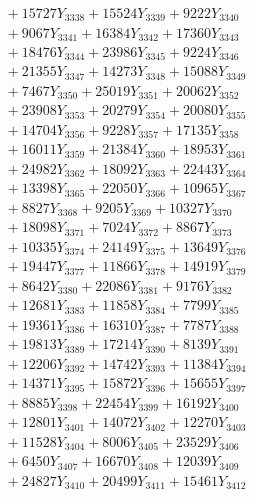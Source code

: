 \documentclass[a4paper,10pt]{article}
\begin{document}
{\begin{align}
&\;  + 15727 Y_{3338} + 15524 Y_{3339} + 9222 Y_{3340} \\[0.3ex]
&\;  + 9067 Y_{3341} + 16384 Y_{3342} + 17360 Y_{3343} \\[0.3ex]
&\;  + 18476 Y_{3344} + 23986 Y_{3345} + 9224 Y_{3346} \\[0.3ex]
&\;  + 21355 Y_{3347} + 14273 Y_{3348} + 15088 Y_{3349} \\[0.3ex]
&\;  + 7467 Y_{3350} + 25019 Y_{3351} + 20062 Y_{3352} \\[0.3ex]
&\;  + 23908 Y_{3353} + 20279 Y_{3354} + 20080 Y_{3355} \\[0.3ex]
&\;  + 14704 Y_{3356} + 9228 Y_{3357} + 17135 Y_{3358} \\[0.5ex]\allowbreak
&\;  + 16011 Y_{3359} + 21384 Y_{3360} + 18953 Y_{3361} \\[0.3ex]
&\;  + 24982 Y_{3362} + 18092 Y_{3363} + 22443 Y_{3364} \\[0.3ex]
&\;  + 13398 Y_{3365} + 22050 Y_{3366} + 10965 Y_{3367} \\[0.3ex]
&\;  + 8827 Y_{3368} + 9205 Y_{3369} + 10327 Y_{3370} \\[0.3ex]
&\;  + 18098 Y_{3371} + 7024 Y_{3372} + 8867 Y_{3373} \\[0.3ex]
&\;  + 10335 Y_{3374} + 24149 Y_{3375} + 13649 Y_{3376} \\[0.3ex]
&\;  + 19447 Y_{3377} + 11866 Y_{3378} + 14919 Y_{3379} \\[0.3ex]
&\;  + 8642 Y_{3380} + 22086 Y_{3381} + 9176 Y_{3382} \\[0.3ex]
&\;  + 12681 Y_{3383} + 11858 Y_{3384} + 7799 Y_{3385} \\[0.3ex]
&\;  + 19361 Y_{3386} + 16310 Y_{3387} + 7787 Y_{3388} \\[0.5ex]\allowbreak
&\;  + 19813 Y_{3389} + 17214 Y_{3390} + 8139 Y_{3391} \\[0.3ex]
&\;  + 12206 Y_{3392} + 14742 Y_{3393} + 11384 Y_{3394} \\[0.3ex]
&\;  + 14371 Y_{3395} + 15872 Y_{3396} + 15655 Y_{3397} \\[0.3ex]
&\;  + 8885 Y_{3398} + 22454 Y_{3399} + 16192 Y_{3400} \\[0.3ex]
&\;  + 12801 Y_{3401} + 14072 Y_{3402} + 12270 Y_{3403} \\[0.3ex]
&\;  + 11528 Y_{3404} + 8006 Y_{3405} + 23529 Y_{3406} \\[0.3ex]
&\;  + 6450 Y_{3407} + 16670 Y_{3408} + 12039 Y_{3409} \\[0.3ex]
&\;  + 24827 Y_{3410} + 20499 Y_{3411} + 15461 Y_{3412} \\[0.3ex]

\end{align}}
\end{document}

